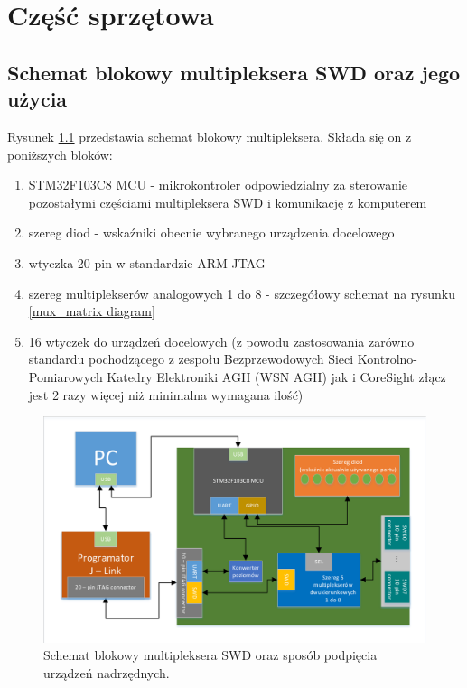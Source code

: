 \chapter{Część sprzętowa} 

\section {Schemat blokowy multipleksera SWD oraz jego użycia}

Rysunek \ref{SWD_multiplexer block diagram} przedstawia schemat blokowy multipleksera. Składa się on z poniższych bloków:
\begin{enumerate}
    \item STM32F103C8 MCU - mikrokontroler odpowiedzialny za sterowanie pozostałymi częściami multipleksera SWD i komunikację z komputerem
    \item szereg diod - wskaźniki obecnie wybranego urządzenia docelowego
    \item wtyczka 20 pin w standardzie ARM JTAG
    \item szereg multiplekserów analogowych 1 do 8 - szczegółowy schemat na rysunku \ref{mux_matrix diagram}
    \item 16 wtyczek do urządzeń docelowych (z powodu zastosowania zarówno standardu pochodzącego z zespołu Bezprzewodowych Sieci Kontrolno-Pomiarowych Katedry Elektroniki AGH (WSN AGH)  jak i CoreSight złącz jest 2 razy więcej niż minimalna wymagana ilość)
\end{enumerate}

 \begin{figure}[H]
    \centering
    \includegraphics[width=0.75\paperwidth]{images/blokowy_hardware_main.pdf}
    \caption{{Schemat blokowy multipleksera SWD oraz sposób podpięcia urządzeń nadrzędnych.}}
    \label{SWD_multiplexer block diagram}
\end{figure}

